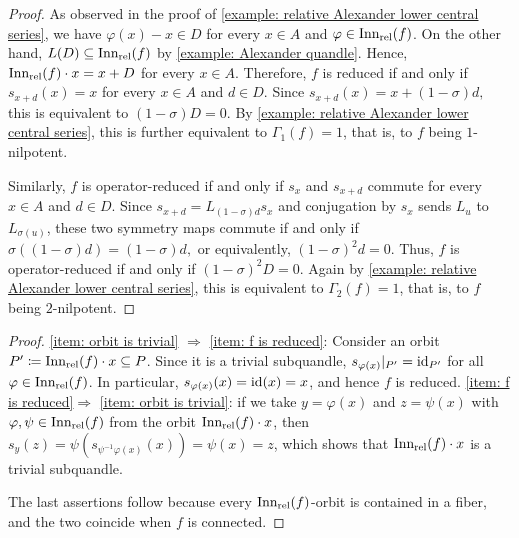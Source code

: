 \begin{proof}
As observed in the proof of
\cref{example: relative Alexander lower central series},
we have $\varphi(x)-x\in D$ for every $x\in A$ and
$\varphi\in\operatorname{Inn_{rel}}(f)$. On the other hand,
$L(D)\subseteq\operatorname{Inn_{rel}}(f)$ by \cref{example: Alexander quandle}.
Hence,
\(
    \operatorname{Inn_{rel}}(f)\cdot x=x+D
\)
for every $x\in A$.
Therefore, $f$ is reduced if and only if
$s_{x+d}(x)=x$ for every $x\in A$ and $d\in D$.
Since
\(
    s_{x+d}(x)=x+(1-\sigma)d,
\)
this is equivalent to $(1-\sigma)D=0$.
By \cref{example: relative Alexander lower central series},
this is further equivalent to $\Gamma_1(f)=1$, that is, to
$f$ being $1$-nilpotent.

Similarly, $f$ is operator-reduced if and only if
$s_x$ and $s_{x+d}$ commute for every $x\in A$ and $d\in D$.
Since
\(
    s_{x+d}=L_{(1-\sigma)d}s_x
\)
and conjugation by $s_x$ sends $L_u$ to $L_{\sigma(u)}$,
these two symmetry maps commute if and only if
\(
    \sigma((1-\sigma)d)=(1-\sigma)d,
\)
or equivalently, $(1-\sigma)^2d=0$.
Thus, $f$ is operator-reduced if and only if
$(1-\sigma)^2D=0$. Again by
\cref{example: relative Alexander lower central series},
this is equivalent to $\Gamma_2(f)=1$, that is, to
$f$ being $2$-nilpotent.
\end{proof}


\begin{proof}
\ref{item: orbit is trivial} $\Rightarrow$ \ref{item: f is reduced}: Consider an orbit $P'\coloneqq \operatorname{Inn_{rel}}(f)\cdot x \subseteq P$. Since it is a trivial subquandle, $s_{\varphi(x)}\rvert_{P'}=\operatorname{id}_{P'}$ for all $\varphi\in \operatorname{Inn_{rel}}(f)$. In particular, $s_{\varphi(x)}(x)=\operatorname{id}(x)=x$, and hence $f$ is reduced.
\ref{item: f is reduced}$\Rightarrow$ \ref{item: orbit is trivial}: if we take $y=\varphi(x)$ and $z=\psi(x)$ with $\varphi,\psi\in\operatorname{Inn_{rel}}(f)$ from the orbit $\operatorname{Inn_{rel}}(f)\cdot x$, then $s_y(z)=\psi(s_{\psi^{-1}\varphi(x)}(x))=\psi(x)=z$, which shows that $\operatorname{Inn_{rel}}(f)\cdot x$ is a trivial subquandle.

The last assertions follow because every $\operatorname{Inn_{rel}}(f)$-orbit is contained in a fiber, and the two coincide when $f$ is connected.
\end{proof}

